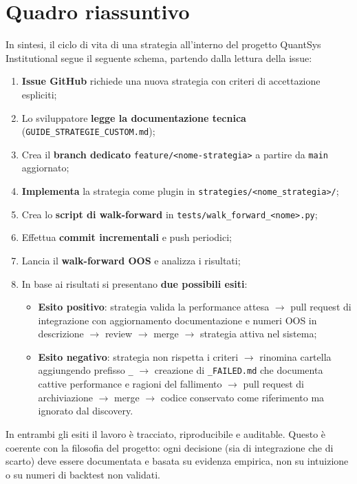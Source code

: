 \section{Quadro riassuntivo}

In sintesi, il ciclo di vita di una strategia all'interno del progetto QuantSys Institutional segue il seguente schema, partendo dalla lettura della issue:

\begin{enumerate}
  \item \textbf{Issue GitHub} richiede una nuova strategia con criteri di accettazione espliciti;
  \item Lo sviluppatore \textbf{legge la documentazione tecnica} (\texttt{GUIDE\_STRATEGIE\_CUSTOM.md});
  \item Crea il \textbf{branch dedicato} \texttt{feature/<nome-strategia>} a partire da \texttt{main} aggiornato;
  \item \textbf{Implementa} la strategia come plugin in \texttt{strategies/<nome\_strategia>/};
  \item Crea lo \textbf{script di walk-forward} in \texttt{tests/walk\_forward\_<nome>.py};
  \item Effettua \textbf{commit incrementali} e push periodici;
  \item Lancia il \textbf{walk-forward OOS} e analizza i risultati;
  \item In base ai risultati si presentano \textbf{due possibili esiti}:
  \begin{itemize}
    \item \textbf{Esito positivo}: strategia valida la performance attesa $\rightarrow$ pull request di integrazione con aggiornamento documentazione e numeri OOS in descrizione $\rightarrow$ review $\rightarrow$ merge $\rightarrow$ strategia attiva nel sistema;
    \item \textbf{Esito negativo}: strategia non rispetta i criteri $\rightarrow$ rinomina cartella aggiungendo prefisso \texttt{\_} $\rightarrow$ creazione di \texttt{\_FAILED.md} che documenta cattive performance e ragioni del fallimento $\rightarrow$ pull request di archiviazione $\rightarrow$ merge $\rightarrow$ codice conservato come riferimento ma ignorato dal discovery.
  \end{itemize}
\end{enumerate}

In entrambi gli esiti il lavoro è tracciato, riproducibile e auditable. Questo è coerente con la filosofia del progetto: ogni decisione (sia di integrazione che di scarto) deve essere documentata e basata su evidenza empirica, non su intuizione o su numeri di backtest non validati.
